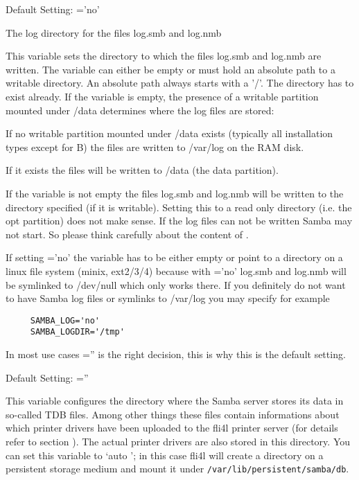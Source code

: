 \begin{description}
    Default Setting: ='no'



    The log directory for the files log.smb and log.nmb

    This variable sets the directory to which the
    files log.smb and log.nmb are written. The variable can
    either be empty or must hold an absolute path to a
    writable directory. An absolute path always starts
    with a '/'. The directory has to exist already.
    If the variable is empty, the presence of a writable
    partition mounted under /data determines
    where the log files are stored:

    If no writable partition mounted under /data exists
    (typically all installation types except for B) the files are
    written to /var/log on the RAM disk.

    If it exists the files will be written to /data (the data partition).

    If the variable is not empty the files log.smb and log.nmb
    will be written to the directory specified (if it is writable). Setting this
    to a read only directory (i.e. the opt partition) does not make sense.
    If the log files can not be written Samba may not start. So please think
    carefully about the content of .

    If setting ='no' the variable
     has to be either empty or point to a directory
    on a linux file system (minix, ext2/3/4) because with
    ='no' log.smb and log.nmb will
    be symlinked to /dev/null which only works there.
    If you definitely do not want to have Samba log files or symlinks to
    /var/log you may specify for example

\begin{example}
\begin{verbatim}
     SAMBA_LOG='no'
     SAMBA_LOGDIR='/tmp'
\end{verbatim}
\end{example}

    In most use cases ='' is the right decision,
    this is why this is the default setting.

    Default Setting: =''


    This variable configures the directory where the Samba server stores
    its data in so-called TDB files. Among other things these files
    contain informations about which printer drivers have been uploaded
    to the fli4l printer server (for details refer to section
    ). The
    actual printer drivers are also stored in this directory.
    You can set this variable to `auto '; in this case fli4l
    will create a directory on a persistent storage medium
    and mount it under \texttt{/var/lib/persistent/samba/db}.


\end{description}
